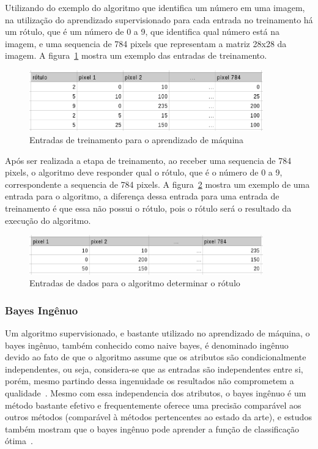 Utilizando do exemplo do algoritmo que identifica um número em uma imagem,
na utilização do aprendizado supervisionado para cada entrada no treinamento
há um rótulo, que é um número de 0 a 9, que identifica qual número está na
imagem, e uma sequencia de 784 pixels que representam a matriz 28x28 da imagem.
A figura~\ref{fig:tabela_ml_treinamento} mostra um exemplo das entradas de
treinamento.

\begin{figure}[h]
  \centering
  \includegraphics[width=0.9\textwidth]{figuras/tabela_ml_treinamento.eps}
  \caption{Entradas de treinamento para o aprendizado de máquina}
  \label{fig:tabela_ml_treinamento}
\end{figure}

Após ser realizada a etapa de treinamento, ao receber uma sequencia de 784
pixels, o algoritmo deve responder qual o rótulo, que é o número de 0 a 9,
correspondente a sequencia de 784 pixels. A figura~\ref{fig:tabela_ml_entrada}
mostra um exemplo de uma entrada para o algoritmo, a diferença dessa entrada
para uma entrada de treinamento é que essa não possui o rótulo, pois o rótulo
será o resultado da execução do algoritmo.

\begin{figure}[h]
  \centering
  \includegraphics[width=0.9\textwidth]{figuras/tabela_ml_entrada.eps}
  \caption{Entradas de dados para o algoritmo determinar o rótulo}
  \label{fig:tabela_ml_entrada}
\end{figure}

\subsubsection{Bayes Ingênuo}

Um algoritmo supervisionado, e bastante utilizado no aprendizado de máquina,
o bayes ingênuo, também conhecido como naive bayes, é denominado ingênuo devido
ao fato de que o algoritmo assume que os atributos são condicionalmente
independentes, ou seja, considera-se que as entradas são independentes entre
si, porém, mesmo partindo dessa ingenuidade os resultados não comprometem a
qualidade~\cite{bruno2010aprendizadomaquina}. Mesmo com essa independencia dos
atributos, o bayes ingênuo é um método bastante efetivo e frequentemente oferece
uma precisão comparável aos outros métodos (comparável à métodos pertencentes ao
estado da arte), e estudos também mostram que o bayes ingênuo pode aprender a
função de classificação ótima~\cite{santos2010naivebayes}.

